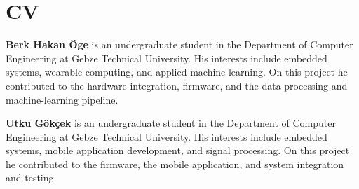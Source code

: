 \chapter*{CV}

\textbf{Berk Hakan Öge} is an undergraduate student in the Department of
Computer Engineering at Gebze Technical University. His interests include
embedded systems, wearable computing, and applied machine learning. On this
project he contributed to the hardware integration, firmware, and the
data-processing and machine-learning pipeline.

\vspace{0.5cm}

\textbf{Utku Gökçek} is an undergraduate student in the Department of Computer
Engineering at Gebze Technical University. His interests include embedded
systems, mobile application development, and signal processing. On this project
he contributed to the firmware, the mobile application, and system integration
and testing.

\clearpage
